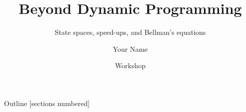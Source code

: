 \documentclass[
	english,
	sections numbered,
	xcolor=dvipsnames,
	aspectratio=169,
]{beamer}
\title{Beyond Dynamic Programming}
\subtitle{State spaces, speed-ups, and Bellman's equations}
\author{Your Name}
\institute[]{Your Affiliation}
\date{Workshop}
\begin{document}
\maketitle

\begin{frame}{Outline}
	[sections numbered]
	\tableofcontents[hideallsubsections]
\end{frame}






\end{document}
